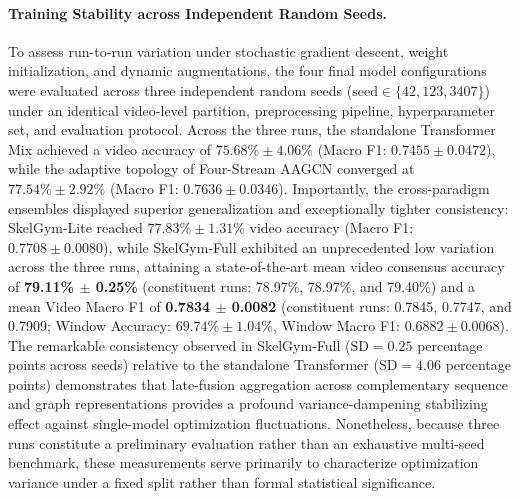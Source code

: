\documentclass[preprint,12pt]{elsarticle}
\begin{document}
\paragraph{Training Stability across Independent Random Seeds.}
To assess run-to-run variation under stochastic gradient descent, weight initialization, and dynamic augmentations, the four final model configurations were evaluated across three independent random seeds ($\text{seed} \in \{42, 123, 3407\}$) under an identical video-level partition, preprocessing pipeline, hyperparameter set, and evaluation protocol. Across the three runs, the standalone Transformer Mix achieved a video accuracy of $75.68\% \pm 4.06\%$ (Macro F1: $0.7455 \pm 0.0472$), while the adaptive topology of Four-Stream AAGCN converged at $77.54\% \pm 2.92\%$ (Macro F1: $0.7636 \pm 0.0346$). Importantly, the cross-paradigm ensembles displayed superior generalization and exceptionally tighter consistency: SkelGym-Lite reached $77.83\% \pm 1.31\%$ video accuracy (Macro F1: $0.7708 \pm 0.0080$), while SkelGym-Full exhibited an unprecedented low variation across the three runs, attaining a state-of-the-art mean video consensus accuracy of \textbf{79.11\% $\pm$ 0.25\%} (constituent runs: 78.97\%, 78.97\%, and 79.40\%) and a mean Video Macro F1 of \textbf{0.7834 $\pm$ 0.0082} (constituent runs: 0.7845, 0.7747, and 0.7909; Window Accuracy: $69.74\% \pm 1.04\%$, Window Macro F1: $0.6882 \pm 0.0068$). The remarkable consistency observed in SkelGym-Full ($\text{SD} = 0.25$ percentage points across seeds) relative to the standalone Transformer ($\text{SD} = 4.06$ percentage points) demonstrates that late-fusion aggregation across complementary sequence and graph representations provides a profound variance-dampening stabilizing effect against single-model optimization fluctuations. Nonetheless, because three runs constitute a preliminary evaluation rather than an exhaustive multi-seed benchmark, these measurements serve primarily to characterize optimization variance under a fixed split rather than formal statistical significance.
\end{document}
